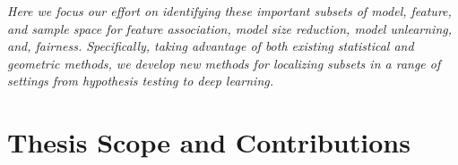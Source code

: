 
\begin{mdframed}[style=MyFrame]
\em 
Here we focus our effort on identifying these important subsets of model, feature, and sample space for feature association, model size reduction, model unlearning, and, fairness. Specifically, taking advantage of both existing statistical and geometric methods, we develop new methods for localizing subsets in a range of settings from hypothesis testing to deep learning.
\end{mdframed}

\section{Thesis Scope and Contributions}

